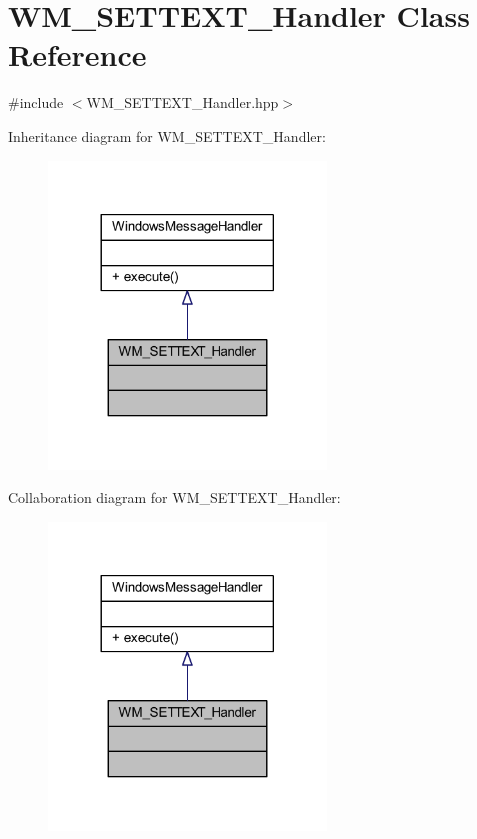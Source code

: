 \hypertarget{class_w_m___s_e_t_t_e_x_t___handler}{}\section{W\+M\+\_\+\+S\+E\+T\+T\+E\+X\+T\+\_\+\+Handler Class Reference}
\label{class_w_m___s_e_t_t_e_x_t___handler}


{\ttfamily \#include $<$W\+M\+\_\+\+S\+E\+T\+T\+E\+X\+T\+\_\+\+Handler.\+hpp$>$}



Inheritance diagram for W\+M\+\_\+\+S\+E\+T\+T\+E\+X\+T\+\_\+\+Handler\+:\nopagebreak
\begin{figure}[H]
\begin{center}
\leavevmode
\includegraphics[width=209pt]{class_w_m___s_e_t_t_e_x_t___handler__inherit__graph}
\end{center}
\end{figure}


Collaboration diagram for W\+M\+\_\+\+S\+E\+T\+T\+E\+X\+T\+\_\+\+Handler\+:\nopagebreak
\begin{figure}[H]
\begin{center}
\leavevmode
\includegraphics[width=209pt]{class_w_m___s_e_t_t_e_x_t___handler__coll__graph}
\end{center}
\end{figure}
